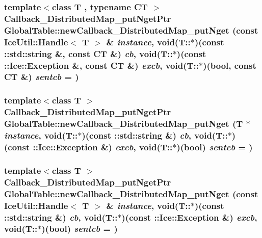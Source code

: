 \label{namespace_global_table_a9ee2209df3a2184964034042fd6f1ecb}
\hypertarget{namespace_global_table_ad2b40e0d4f3150e5ed3477e24b5366a7}{
\subsubsection[{newCallback\_\-DistributedMap\_\-putNget}]{\setlength{\rightskip}{0pt plus 5cm}template$<$class T , typename CT $>$ {\bf Callback\_\-DistributedMap\_\-putNgetPtr} GlobalTable::newCallback\_\-DistributedMap\_\-putNget (const IceUtil::Handle$<$ T $>$ \& {\em instance}, \/  void(T::$\ast$)(const ::std::string \&, const CT \&) {\em cb}, \/  void(T::$\ast$)(const ::Ice::Exception \&, const CT \&) {\em excb}, \/  void(T::$\ast$)(bool, const CT \&) {\em sentcb} = {})}}
\label{namespace_global_table_ad2b40e0d4f3150e5ed3477e24b5366a7}
\hypertarget{namespace_global_table_a5a05f2b3952e9e01b2eb083ed91c2426}{
\subsubsection[{newCallback\_\-DistributedMap\_\-putNget}]{\setlength{\rightskip}{0pt plus 5cm}template$<$class T $>$ {\bf Callback\_\-DistributedMap\_\-putNgetPtr} GlobalTable::newCallback\_\-DistributedMap\_\-putNget (T $\ast$ {\em instance}, \/  void(T::$\ast$)(const ::std::string \&) {\em cb}, \/  void(T::$\ast$)(const ::Ice::Exception \&) {\em excb}, \/  void(T::$\ast$)(bool) {\em sentcb} = {})}}
\label{namespace_global_table_a5a05f2b3952e9e01b2eb083ed91c2426}
\hypertarget{namespace_global_table_a22b3fb5dbf946b04af1956dd48b1cb4c}{
\subsubsection[{newCallback\_\-DistributedMap\_\-putNget}]{\setlength{\rightskip}{0pt plus 5cm}template$<$class T $>$ {\bf Callback\_\-DistributedMap\_\-putNgetPtr} GlobalTable::newCallback\_\-DistributedMap\_\-putNget (const IceUtil::Handle$<$ T $>$ \& {\em instance}, \/  void(T::$\ast$)(const ::std::string \&) {\em cb}, \/  void(T::$\ast$)(const ::Ice::Exception \&) {\em excb}, \/  void(T::$\ast$)(bool) {\em sentcb} = {})}}
